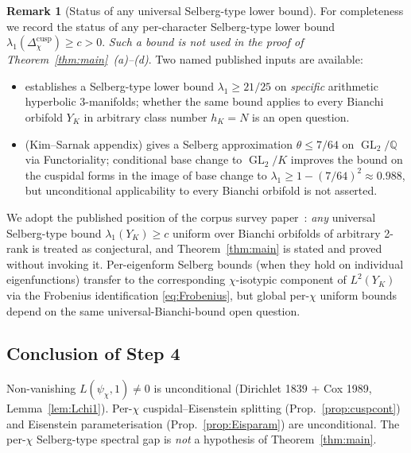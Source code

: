 \documentclass[11pt,a4paper,reqno]{amsart}
\theoremstyle{definition}
\newtheorem{remark}[theorem]{Remark}
\DeclareMathOperator{\GL}{GL}
\newcommand{\QQ}{\mathbb{Q}}
\newcommand{\YK}{Y_K}
\begin{document}
\begin{remark}[Status of any universal Selberg-type lower bound]\label{rem:Selberggap}
For completeness we record the status of any per-character Selberg-type lower bound $\lambda_1(\Delta_\chi^{\mathrm{cusp}})\geq c>0$. \emph{Such a bound is not used in the proof of Theorem~\ref{thm:main}~(a)--(d)}. Two named published inputs are available:

\begin{itemize}[leftmargin=2em]
  \item \cite{Sarnak1983} establishes a Selberg-type lower bound $\lambda_1\geq 21/25$ on \emph{specific} arithmetic hyperbolic 3-manifolds; whether the same bound applies to every Bianchi orbifold $\YK$ in arbitrary class number $h_K=N$ is an open question.
  \item \cite{Kim2003} (Kim--Sarnak appendix) gives a Selberg approximation $\theta\leq 7/64$ on $\GL_2/\QQ$ via Functoriality; conditional base change to $\GL_2/K$ improves the bound on the cuspidal forms in the image of base change to $\lambda_1\geq 1-(7/64)^2\approx 0.988$, but unconditional applicability to every Bianchi orbifold is not asserted.
\end{itemize}

We adopt the published position of the corpus survey paper~\cite[\S\,``Status downgrade'']{Remondiere2026Survey}: \emph{any} universal Selberg-type bound $\lambda_1(\YK)\geq c$ uniform over Bianchi orbifolds of arbitrary 2-rank is treated as conjectural, and Theorem~\ref{thm:main} is stated and proved without invoking it. Per-eigenform Selberg bounds (when they hold on individual eigenfunctions) transfer to the corresponding $\chi$-isotypic component of $L^2(\YK)$ via the Frobenius identification \eqref{eq:Frobenius}, but global per-$\chi$ uniform bounds depend on the same universal-Bianchi-bound open question.
\end{remark}

\subsection*{Conclusion of Step 4}
Non-vanishing $L(\psi_\chi,1)\neq 0$ is unconditional (Dirichlet 1839 + Cox 1989, Lemma~\ref{lem:Lchi1}). Per-$\chi$ cuspidal--Eisenstein splitting (Prop.~\ref{prop:cuspcont}) and Eisenstein parameterisation (Prop.~\ref{prop:Eisparam}) are unconditional. The per-$\chi$ Selberg-type spectral gap is \emph{not} a hypothesis of Theorem~\ref{thm:main}.

\end{document}
